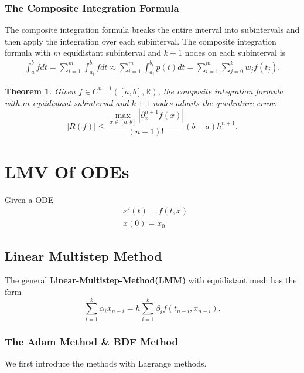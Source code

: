\documentclass[a4paper,12pt,oneside,fleqn]{book}
\newtheorem{theorem}{Theorem}[section]
\theoremstyle{definition}
\theoremstyle{remark}
\begin{document}
\subsubsection{The Composite Integration Formula}
The composite integration formula breaks the entire interval into subintervals and then apply the integration over each subinterval. The composite integration formula with $m$ equidistant subinterval and $k+1$ nodes on each subinterval is
\begin{align*}
	\int_a^b f dt = \sum_{i = 1}^m \int_{a_i}^{b_i} f dt
	\approx \sum_{i = 1}^m \int_{a_i}^{b_i} p(t)dt  
	= \sum_{i = 1}^m \sum_{j = 0}^k w_j f(t_j).
\end{align*}

\begin{theorem}
	Given $f \in C^{n + 1}([a, b], \mathbb{R})$, the composite integration formula with $m$ equidistant subinterval and $k + 1$ nodes admits the quadrature error:
	\begin{equation}
		|R(f)| \le \frac{ \max_{x \in [a, b]}| \partial_x^{n + 1} f(x)|}{(n + 1)!} (b - a)h^{n + 1}.
	\end{equation}
\end{theorem}

\section{LMV Of ODEs}
Given a ODE
\begin{equation}
\begin{aligned}
	&x'(t) = f(t, x)\\
	&x(0) = x_0
\end{aligned}
\end{equation}






\subsection{Linear Multistep Method}
The general \textbf{Linear-Multistep-Method(LMM) }with equidistant mesh has the form
\begin{equation}
	 \sum_{i = 1}^k \alpha_{i} x_{n -i} = h \sum_{i = 1}^k \beta_{i} f(t_{n - i}, x_{n -i}).
\end{equation}
\subsubsection{The Adam Method \& BDF Method}
We first introduce the methods with Lagrange methods. 
\end{document}
